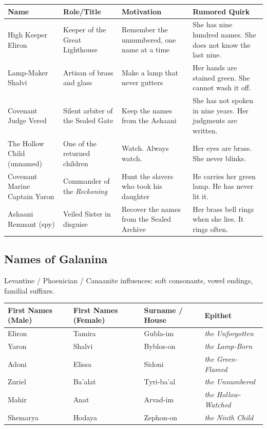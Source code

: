 \begin{longtable}{|p{}|p{}|p{}|p{}|}
\hline
\textbf{Name} & \textbf{Role/Title} & \textbf{Motivation} & \textbf{Rumored Quirk} \\
\hline
High Keeper Eliron & Keeper of the Great Lighthouse & Remember the unnumbered, one name at a time & She has nine hundred names. She does not know the last nine. \\
\hline
Lamp-Maker Shalvi & Artisan of brass and glass & Make a lamp that never gutters & Her hands are stained green. She cannot wash it off. \\
\hline
Covenant Judge Vered & Silent arbiter of the Sealed Gate & Keep the names from the Ashaani & She has not spoken in nine years. Her judgments are written. \\
\hline
The Hollow Child (unnamed) & One of the returned children & Watch. Always watch. & Her eyes are brass. She never blinks. \\
\hline
Covenant Marine Captain Yaron & Commander of the \textit{Reckoning} & Hunt the slavers who took his daughter & He carries her green lamp. He has never lit it. \\
\hline
Ashaani Remnant (spy) & Veiled Sister in disguise & Recover the names from the Sealed Archive & Her brass bell rings when she lies. It rings often. \\
\hline
\end{longtable}

\subsection*{Names of Galanina}
\label{sec:galanina-names}

Levantine / Phoenician / Canaanite influences: soft consonants, vowel endings, familial suffixes.

\begin{longtable}{|p{}|p{}|p{}|p{}|}
\hline
\textbf{First Names (Male)} & \textbf{First Names (Female)} & \textbf{Surname / House} & \textbf{Epithet} \\
\hline
Eliron & Tamira & Gubla-im & \textit{the Unforgotten} \\
\hline
Yaron & Shalvi & Byblos-on & \textit{the Lamp-Born} \\
\hline
Adoni & Elissa & Sidoni & \textit{the Green-Flamed} \\
\hline
Zuriel & Ba'alat & Tyri-ba'al & \textit{the Unnumbered} \\
\hline
Mahir & Anat & Arvad-im & \textit{the Hollow-Watched} \\
\hline
Shemarya & Hodaya & Zephon-on & \textit{the Ninth Child} \\
\hline
\end{longtable}

